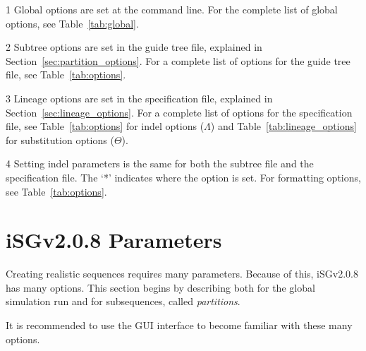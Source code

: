 \documentclass[10pt]{article}
\newcommand{\version}{2.0.8 }
\newcommand{\iSGcurrentshort}{iSGv\version }
\begin{document}
\begin{center}
\begin{threeparttable}
\begin{tabular}{cclll}
 \hline \hline
\end{tabular}
\begin{tablenotes}
\item[1] Global options are set at the command line. For the complete list of global options, see Table~\ref{tab:global}.
\item[2] Subtree options are set in the guide tree file, explained in Section~\ref{sec:partition_options}. For a complete list of options for the guide tree file, see Table~\ref{tab:options}.
\item[3] Lineage options are set in the specification file, explained in Section~\ref{sec:lineage_options}. For a complete list of options for the specification file, see Table~\ref{tab:options} for indel options ($\Lambda$) and Table~\ref{tab:lineage_options} for substitution options ($\Theta$).
\item[4] Setting indel parameters is the same for both the subtree file and the specification file. The `*' indicates where the option is set. For formatting options, see Table~\ref{tab:options}.
\end{tablenotes}
\label{tab:precedence_specific}
\end{threeparttable}
\end{center}

\section{\iSGcurrentshort Parameters}

Creating realistic sequences requires many parameters. Because of this, \iSGcurrentshort  has many options. This section begins by describing both for the global simulation run and for subsequences, called {\it partitions}.
\begin{GUI3}
It is recommended to use the GUI interface to become familiar with these many options.
\end{GUI3}
\end{document}
